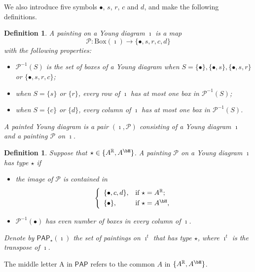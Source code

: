 \documentclass[12pt,a4paper]{amsart}
\newcommand{\CP}{{\mathcal {P}}}
\newcommand{\R}{\mathbb R}
\numberwithin{equation}{section}
\newtheorem{defn}[thm]{Definition}
\theoremstyle{remark}
\def\CP{\mathsf{CP}}
\def\PAP{\mathsf{PAP}}
\begin{document}
\renewcommand{\CP}{\mathcal{P}} We also introduce five symbols $\bullet$, $s$,
$r$, $c$ and $d$, and make the following definitions.
\begin{defn}
  A painting on a Young diagram $\imath$ is a map
  \[
    \mathcal P: \mathrm{Box}(\imath) \rightarrow \{\bullet, s, r, c, d \}
  \]
  with the following properties:
  \begin{itemize}
    \item $\mathcal P^{-1}(S)$ is the set of boxes of a Young diagram when
          $S=\{\bullet\}, \{\bullet, s \}, \{\bullet, s, r\}$ or
          $\{\bullet, s, r, c \} $;
    \item when $S=\{s\}$ or $ \{r\}$, every row of $\imath$ has at most one box
          in $\CP^{-1}(S)$;
    \item when $S=\{c\}$ or $ \{d \}$, every column of $\imath$ has at most one
          box in $\CP^{-1}(S)$.
  \end{itemize}
A painted Young diagram is a pair $(\imath, \CP)$ consisting of a Young diagram $\imath$ and a painting $\CP$ on $\imath$.
\end{defn}



\begin{defn}\label{defpbp0}
  Suppose that $\star\in \{A^\R, A^\bH\}$. A painting $\CP$ on a Young diagram
  $\imath$ has type $\star$ if
  \begin{itemize}
    \item the image of $\CP$ is contained in
          \[
          \left\{
          \begin{array}{ll}
            \{\bullet, c, d\}, &\hbox{if $\star=A^\R$}; \smallskip\\
            \{\bullet\}, &\hbox{if $\star=A^\bH$},                      \end{array}
        \right.
          \]
    \item $\CP^{-1}(\bullet)$ has even number of
          boxes in every column of $\imath$.  \end{itemize}
  Denote by $\PAP_\star(\imath)$ the set of paintings on $\imath^{t}$ that has type $\star$, where $\imath^{t}$
  is the transpose of $\imath$.
   \end{defn}


The middle letter $\mathrm A$ in $\PAP$ refers to the common $A$ in $\{A^\R, A^\bH\}$.
\end{document}
